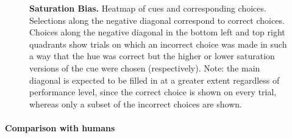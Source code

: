 \begin{figure}

\caption{\textbf{Saturation Bias.}
Heatmap of cues and corresponding choices. Selections along the negative diagonal correspond to correct choices. Choices along the negative diagonal in the bottom left and top right quadrants show trials on which an incorrect choice was made in such a way that the hue was correct but the higher or lower saturation versions of the cue were chosen (respectively). Note: the main diagonal is expected to be filled in at a greater extent regardless of performance level, since the correct choice is shown on every trial, whereas only a subset of the incorrect choices are shown.}
\label{fig:saturationBias}
\end{figure}



\paragraph{Comparison with humans} %
